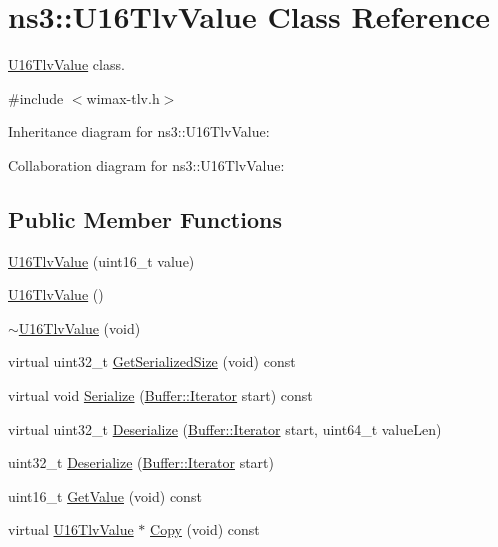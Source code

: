 \hypertarget{classns3_1_1U16TlvValue}{}\section{ns3\+:\+:U16\+Tlv\+Value Class Reference}
\label{classns3_1_1U16TlvValue}


\hyperlink{classns3_1_1U16TlvValue}{U16\+Tlv\+Value} class.  




{\ttfamily \#include $<$wimax-\/tlv.\+h$>$}



Inheritance diagram for ns3\+:\+:U16\+Tlv\+Value\+:


Collaboration diagram for ns3\+:\+:U16\+Tlv\+Value\+:
\subsection*{Public Member Functions}
\begin{DoxyCompactItemize}
\item 
\hyperlink{classns3_1_1U16TlvValue_a81702de563dfcba45098336ce7e53413}{U16\+Tlv\+Value} (uint16\+\_\+t value)
\item 
\hyperlink{classns3_1_1U16TlvValue_a1bb27264356a093c30256a647dc10e1a}{U16\+Tlv\+Value} ()
\item 
\hyperlink{classns3_1_1U16TlvValue_ab9b7ab9ee825f98cc24193851be4b483}{$\sim$\+U16\+Tlv\+Value} (void)
\item 
virtual uint32\+\_\+t \hyperlink{classns3_1_1U16TlvValue_a07ed64586a6ef8e4ba4df6039e30c63f}{Get\+Serialized\+Size} (void) const 
\item 
virtual void \hyperlink{classns3_1_1U16TlvValue_a0eab595acae8d13e93368fbd14d83e8a}{Serialize} (\hyperlink{classns3_1_1Buffer_1_1Iterator}{Buffer\+::\+Iterator} start) const 
\item 
virtual uint32\+\_\+t \hyperlink{classns3_1_1U16TlvValue_a21b9ccc54f83f70bdf6ce449c0a5f63b}{Deserialize} (\hyperlink{classns3_1_1Buffer_1_1Iterator}{Buffer\+::\+Iterator} start, uint64\+\_\+t value\+Len)
\item 
uint32\+\_\+t \hyperlink{classns3_1_1U16TlvValue_a7d9e5d59ae89ac40329e69341538df19}{Deserialize} (\hyperlink{classns3_1_1Buffer_1_1Iterator}{Buffer\+::\+Iterator} start)
\item 
uint16\+\_\+t \hyperlink{classns3_1_1U16TlvValue_a1411b1e2c1443a4d0495e5e7c8a2e900}{Get\+Value} (void) const 
\item 
virtual \hyperlink{classns3_1_1U16TlvValue}{U16\+Tlv\+Value} $\ast$ \hyperlink{classns3_1_1U16TlvValue_a11e8912bb2c22e3890c7e994ca6338a0}{Copy} (void) const 
\end{DoxyCompactItemize}
